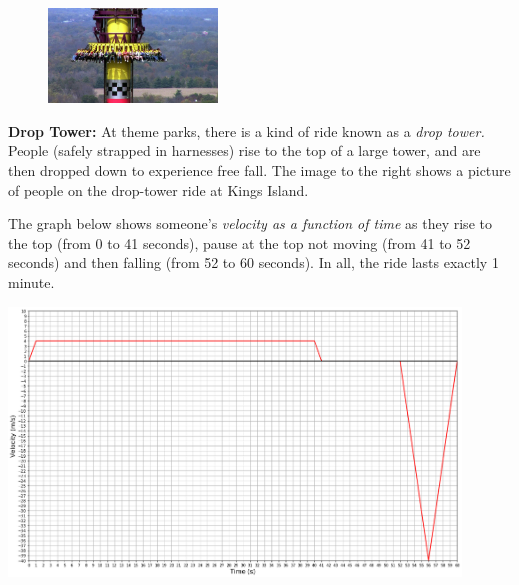 \documentclass[addpoints,12pt]{exam}
\begin{document}
\begin{questions}

\begin{minipage}{\linewidth}
\begin{figure}
	\vspace{-20pt}
	\begin{center}\includegraphics[width=0.4\textwidth]{../images/drop_tower_image.jpg}\end{center}
	\vspace{-20pt}
\end{figure}

\question \textbf{Drop Tower:} At theme parks, there is a kind of ride known as a \textit{drop tower.} People (safely strapped in harnesses) rise to the top of a large tower, and are then dropped down to experience free fall. The image to the right shows a picture of people on the drop-tower ride at Kings Island.

The graph below shows someone's \textit{velocity as a function of time} as they rise to the top (from 0 to 41 seconds), pause at the top not moving (from 41 to 52 seconds) and then falling (from 52 to 60 seconds). In all, the ride lasts exactly 1 minute.

\noindent\begin{center}
\includegraphics[width=0.9\textwidth]{../images/test1V1_dropTower.png}
\end{center}


\end{minipage}
\end{questions}
\end{document}
